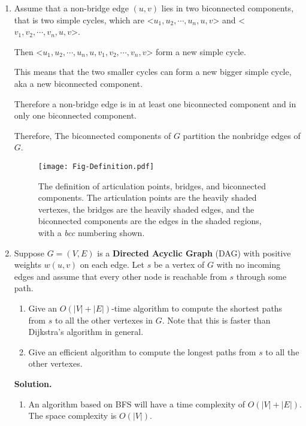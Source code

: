 \documentclass[12pt,a4paper]{article}
\makeatletter
\newtheorem*{solution}{Solution}
\theoremstyle{definition}
\renewenvironment{solution}[1][Solution] {\par\pushQED{\qed}\normalfont\topsep6\p@\@plus6\p@\relax\trivlist\item[\hskip\labelsep\bfseries#1\@addpunct{.}]\ignorespaces}{\popQED\endtrivlist\@endpefalse} \makeatother
\makeatother
\begin{document}
\begin{enumerate}
\begin{solution}
\begin{enumerate}
\begin{itemize}
                	    Assume that a non-bridge edge $(u,v)$ lies in two biconnected components, that is two simple cycles, which are <$u_1,u_2,\cdots,u_n,u,v$> and <$v_1,v_2,\cdots,v_n,u,v$>.
                	    
                	    Then <$u_1,u_2,\cdots,u_n,u,v_1,v_2,\cdots,v_n,v$> form a new simple cycle.
                	    
                	    This means that the two smaller cycles can form a new bigger simple cycle, aka a new biconnected component.
                	    
                	    Therefore a non-bridge edge is in at least one biconnected component and in only one biconnected component.
                \end{itemize}
            
                Therefore, The biconnected components of $G$ partition the nonbridge edges of $G$.
    	\end{enumerate}
    \end{solution}

	 \begin{figure}[htbp]
	 	
		\centering
		\texttt{[image: Fig-Definition.pdf]}
		\caption{The definition of articulation points, bridges, and biconnected components. The articulation points are the heavily shaded vertexes, the bridges are the heavily shaded edges, and the biconnected components are the edges in the shaded regions, with a \textit{bcc} numbering shown.}
		\label{def}
	\end{figure}

    \item
    Suppose $G=(V, E)$ is a \textbf{Directed Acyclic Graph} (DAG) with positive weights $w(u, v)$ on each edge. Let $s$ be a vertex of $G$ with no incoming edges and assume that every other node is reachable from $s$ through some path.
    
    \begin{enumerate}
    	\item
    	Give an $O(|V|+|E|)$-time algorithm to compute the shortest paths from $s$ to all the other vertexes in $G$. Note that this is faster than Dijkstra's algorithm in general.
    	\item
    	Give an efficient algorithm to compute the longest paths from $s$ to all the other vertexes.
    \end{enumerate}
    \textbf{Solution.}
    
        \begin{enumerate}
        	\item 
        	    An algorithm based on BFS will have a time complexity of $O(|V|+|E|)$. The space complexity is $O(|V|)$.
        	    

\end{enumerate}
\end{enumerate}
\end{document}
